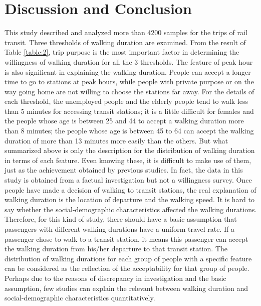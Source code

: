 \documentclass[Journal,letterpaper]{ascelike-new}
\begin{document}
\section{Discussion and Conclusion}
This study described and analyzed more than 4200 samples for the trips of rail transit. Three thresholds of walking duration are examined. From the result of Table \ref{table:2}, trip purpose is the most important factor in determining the willingness of walking duration for all the 3 thresholds. The feature of peak hour is also significant in explaining the walking duration. People can accept a longer time to go to stations at peak hours, while people with private purpose or on the way going home are not willing to choose the stations far away. For the details of each threshold, the unemployed people and the elderly people tend to walk less than 5 minutes for accessing transit stations; it is a little difficult for females and the people whose age is between 25 and 44 to accept a walking duration more than 8 minutes; the people whose age is between 45 to 64 can accept the walking duration of more than 13 minutes more easily than the others.
%
But what summarized above is only the description for the distribution of walking duration in terms of each feature. Even knowing these, it is difficult to make use of them, just as the achievement obtained by previous studies. In fact, the data in this study is obtained from a factual investigation but not a willingness survey. Once people have made a decision of walking to transit stations, the real explanation of walking duration is the location of departure and the walking speed. It is hard to say whether the social-demographic characteristics affected the walking durations. Therefore, for this kind of study, there should have a basic assumption that passengers with different walking durations have a uniform travel rate. If a passenger chose to walk to a transit station, it means this passenger can accept the walking duration from his/her departure to that transit station. The distribution of walking durations for each group of people with a specific feature can be considered as the reflection of the acceptability for that group of people. Perhaps due to the reasons of discrepancy in investigation and the basic assumption, few studies can explain the relevant between walking duration and social-demographic characteristics quantitatively.
%
\end{document}
